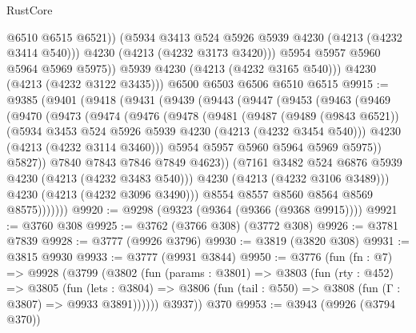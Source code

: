 \begin{lexlean}{RustCore}
\begin{coremodule}
                  @6510
                  @6515
                  @6521))
              (@5934 @3413 @524 @5926 @5939 @4230 (@4213 (@4232 @3414 @540)))
              @4230
              (@4213 (@4232 @3173 @3420)))
            @5954
            @5957
            @5960
            @5964
            @5969
            @5975))
        @5939
        @4230
        (@4213 (@4232 @3165 @540)))
      @4230
      (@4213 (@4232 @3122 @3435)))
    @6500
    @6503
    @6506
    @6510
    @6515
@9915 := @9385
    (@9401
      (@9418
        (@9431
          (@9439
            (@9443
              (@9447
                (@9453
                  (@9463
                    (@9469
                      (@9470
                        (@9473
                          (@9474
                            (@9476
                              (@9478
                                (@9481
                                  (@9487
                                    (@9489 (@9843 @6521))
                                    (@5934 @3453 @524 @5926 @5939 @4230 (@4213 (@4232 @3454 @540)))
                                    @4230
                                    (@4213 (@4232 @3114 @3460)))
                                  @5954
                                  @5957
                                  @5960
                                  @5964
                                  @5969
                                  @5975))
                              @5827))
                          @7840
                          @7843
                          @7846
                          @7849
                          @4623))
                      (@7161 @3482 @524 @6876 @5939 @4230 (@4213 (@4232 @3483 @540)))
                      @4230
                      (@4213 (@4232 @3106 @3489)))
                    @4230
                    (@4213 (@4232 @3096 @3490)))
                  @8554
                  @8557
                  @8560
                  @8564
                  @8569
                  @8575)))))))
@9920 := @9298 (@9323 (@9364 (@9366 (@9368 @9915))))
@9921 := @3760 @308
@9925 := @3762 (@3766 @308) (@3772 @308)
@9926 := @3781 @7839
@9928 := @3777 (@9926 @3796)
@9930 := @3819 (@3820 @308)
@9931 := @3815 @9930
@9933 := @3777 (@9931 @3844)
@9950 := @3776
    (fun (fn : @7) =>
    @9928
      (@3799
        (@3802
          (fun (params : @3801) =>
          @3803
            (fun (rty : @452) =>
            @3805
              (fun (lets : @3804) =>
              @3806 (fun (tail : @550) => @3808 (fun (Γ : @3807) => @9933 @3891))))))
        @3937))
    @370
@9953 := @3943 (@9926 (@3794 @370))

\end{coremodule}
\end{lexlean}
